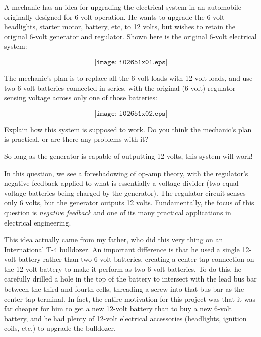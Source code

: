 

A mechanic has an idea for upgrading the electrical system in an automobile originally designed for 6 volt operation.  He wants to upgrade the 6 volt headlights, starter motor, battery, etc, to 12 volts, but wishes to retain the original 6-volt generator and regulator.  Shown here is the original 6-volt electrical system:

$$\texttt{[image: i02651x01.eps]}$$

The mechanic's plan is to replace all the 6-volt loads with 12-volt loads, and use two 6-volt batteries connected in series, with the original (6-volt) regulator sensing voltage across only one of those batteries:

$$\texttt{[image: i02651x02.eps]}$$

Explain how this system is supposed to work.  Do you think the mechanic's plan is practical, or are there any problems with it?







So long as the generator is capable of outputting 12 volts, this system will work!

\vskip 10pt

In this question, we see a foreshadowing of op-amp theory, with the regulator's negative feedback applied to what is essentially a voltage divider (two equal-voltage batteries being charged by the generator).  The regulator circuit senses only 6 volts, but the generator outputs 12 volts.  Fundamentally, the focus of this question is {\it negative feedback} and one of its many practical applications in electrical engineering.

\vskip 10pt

This idea actually came from my father, who did this very thing on an International T-4 bulldozer.  An important difference is that he used a single 12-volt battery rather than two 6-volt batteries, creating a center-tap connection on the 12-volt battery to make it perform as two 6-volt batteries.  To do this, he carefully drilled a hole in the top of the battery to intersect with the lead bus bar between the third and fourth cells, threading a screw into that bus bar as the center-tap terminal.  In fact, the entire motivation for this project was that it was far cheaper for him to get a new 12-volt battery than to buy a new 6-volt battery, and he had plenty of 12-volt electrical accessories (headlights, ignition coils, etc.) to upgrade the bulldozer.

